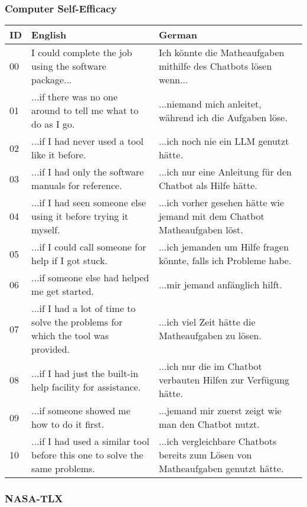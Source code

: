 \clearpage
\subsubsection*{Computer Self-Efficacy}

\begin{ctable}
    \begin{tabularx}{\textwidth}{l|X|X}
        \textbf{ID} & \textbf{English} & \textbf{German} \\
        \hline
        00 & I could complete the job using the software package... & Ich könnte die Matheaufgaben mithilfe des Chatbots lösen wenn... \\
        \hline
        01 & ...if there was no one around to tell me what to do as I go. & ...niemand mich anleitet, während ich die Aufgaben löse. \\
        02 & ...if I had never used a tool like it before. & ...ich noch nie ein LLM genutzt hätte. \\
        03 & ...if I had only the software manuals for reference. & ...ich nur eine Anleitung für den Chatbot als Hilfe hätte. \\
        04 & ...if I had seen someone else using it before trying it myself. & ...ich vorher gesehen hätte wie jemand mit dem Chatbot Matheaufgaben löst. \\
        05 & ...if I could call someone for help if I got stuck. & ...ich jemanden um Hilfe fragen könnte, falls ich Probleme habe. \\
        06 & ...if someone else had helped me get started. & ...mir jemand anfänglich hilft. \\
        07 & ...if I had a lot of time to solve the problems for which the tool was provided. & ...ich viel Zeit hätte die Matheaufgaben zu lösen. \\
        08 & ...if I had just the built-in help facility for assistance. & ...ich nur die im Chatbot verbauten Hilfen zur Verfügung hätte. \\
        09 & ...if someone showed me how to do it first. & ...jemand mir zuerst zeigt wie man den Chatbot nutzt. \\
        10 & ...if I had used a similar tool before this one to solve the same problems. & ...ich vergleichbare Chatbots bereits zum Lösen von Matheaufgaben genutzt hätte. \\
    \end{tabularx}
\end{ctable}

\clearpage
\subsubsection*{\ac{NASA}-\ac{TLX}}

